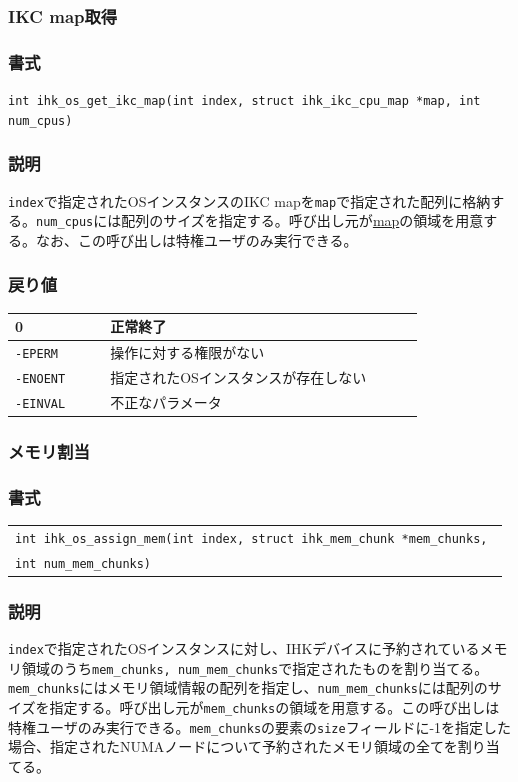 \documentclass[twoside,11pt,fleqn]{book}
\newcommand\textttw[1]{\mathchardef\UrlBreakPenalty=100\mathchardef\UrlBigBreakPenalty=100\url{#1}}
\begin{document}
\subsubsection{IKC map取得}
\subsubsection*{書式}{\quad} \texttt{int ihk\_os\_get\_ikc\_map(int index, struct ihk\_ikc\_cpu\_map *map, int num\_cpus)}
\subsubsection*{説明}{\quad} \texttt{index}で指定されたOSインスタンスのIKC mapを\texttt{map}で指定された配列に格納する。\texttt{num\_cpus}には配列のサイズを指定する。呼び出し元が\textttw{map}の領域を用意する。なお、この呼び出しは特権ユーザのみ実行できる。

\subsubsection*{戻り値}
\begin{table}[!h]
\footnotesize
\begin{tabular}{|p{0.20\linewidth}|p{0.66\linewidth}|} \hline
0&正常終了\\ \hline
\texttt{-EPERM}&操作に対する権限がない\\ \hline
\texttt{-ENOENT}&指定されたOSインスタンスが存在しない\\ \hline
\texttt{-EINVAL}&不正なパラメータ\\ \hline
\end{tabular}
\vspace{-0em}
\end{table}
\FloatBarrier

\subsubsection{メモリ割当}
\subsubsection*{書式}\begin{tabular}[t]{@{}l@{}}{\quad} \texttt{int ihk\_os\_assign\_mem(int index, struct ihk\_mem\_chunk *mem\_chunks, }\\{\quad}{\quad}\texttt{int num\_mem\_chunks)}\end{tabular}
\subsubsection*{説明}{\quad} \texttt{index}で指定されたOSインスタンスに対し、IHKデバイスに予約されているメモリ領域のうち\texttt{mem\_chunks, num\_mem\_chunks}で指定されたものを割り当てる。\texttt{mem\_chunks}にはメモリ領域情報の配列を指定し、\texttt{num\_mem\_chunks}には配列のサイズを指定する。呼び出し元が\texttt{mem\_chunks}の領域を用意する。この呼び出しは特権ユーザのみ実行できる。\texttt{mem\_chunks}の要素の\texttt{size}フィールドに-1を指定した場合、指定されたNUMAノードについて予約されたメモリ領域の全てを割り当てる。
\end{document}

